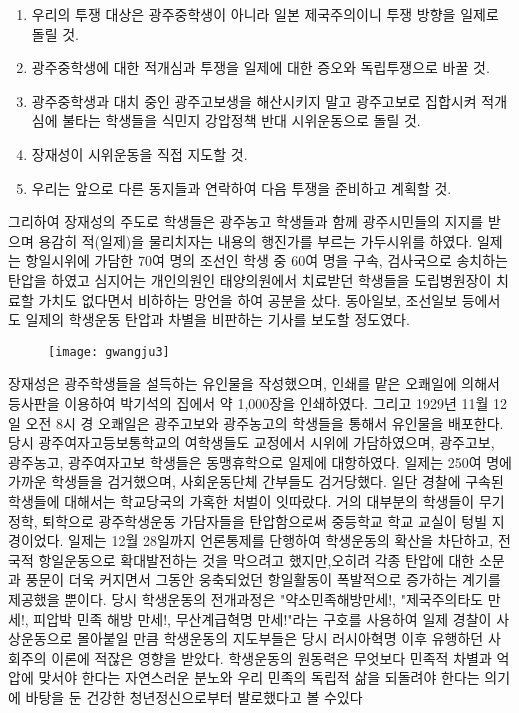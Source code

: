 \begin{enumerate}
\item 우리의 투쟁 대상은 광주중학생이 아니라 일본 제국주의이니 투쟁 방향을 일제로 돌릴 것.
\item 광주중학생에 대한 적개심과 투쟁을 일제에 대한 증오와 독립투쟁으로 바꿀 것.
\item 광주중학생과 대치 중인 광주고보생을 해산시키지 말고 광주고보로 집합시켜 적개심에 불타는 학생들을 식민지 강압정책 반대 시위운동으로 돌릴 것.
\item 장재성이 시위운동을 직접 지도할 것.
\item 우리는 앞으로 다른 동지들과 연락하여 다음 투쟁을 준비하고 계획할 것.
\end{enumerate}

그리하여 장재성의 주도로 학생들은 광주농고 학생들과 함께 광주시민들의 지지를 받으며 용감히 적(일제)을 물리치자는 내용의 행진가를 부르는 가두시위를 하였다. 일제는 항일시위에 가담한 70여 명의 조선인 학생 중 60여 명을 구속, 검사국으로 송치하는 탄압을 하였고 심지어는 개인의원인 태양의원에서 치료받던 학생들을 도립병원장이 치료할 가치도 없다면서 비하하는 망언을 하여 공분을 샀다. 동아일보, 조선일보 등에서도 일제의 학생운동 탄압과 차별을 비판하는 기사를 보도할 정도였다.

\begin{figure}
\texttt{[image: gwangju3]}
\end{figure}

장재성은 광주학생들을 설득하는 유인물을 작성했으며, 인쇄를 맡은 오쾌일에 의해서 등사판을 이용하여 박기석의 집에서 약 1,000장을 인쇄하였다. 그리고 1929년 11월 12일 오전 8시 경 오쾌일은 광주고보와 광주농고의 학생들을 통해서 유인물을 배포한다. 당시 광주여자고등보통학교의 여학생들도 교정에서 시위에 가담하였으며, 광주고보, 광주농고, 광주여자고보 학생들은 동맹휴학으로 일제에 대항하였다. 일제는 250여 명에 가까운 학생들을 검거했으며, 사회운동단체 간부들도 검거당했다. 일단 경찰에 구속된 학생들에 대해서는 학교당국의 가혹한 처벌이 잇따랐다. 거의 대부분의 학생들이 무기정학, 퇴학으로 광주학생운동 가담자들을 탄압함으로써 중등학교 학교 교실이 텅빌 지경이었다. 일제는 12월 28일까지 언론통제를 단행하여 학생운동의 확산을 차단하고, 전국적 항일운동으로 확대발전하는 것을 막으려고 했지만,오히려 각종 탄압에 대한 소문과 풍문이 더욱 커지면서 그동안 웅축되었던 항일활동이 폭발적으로 증가하는 계기를 제공했을 뿐이다. 당시 학생운동의 전개과정은 "약소민족해방만세!, "제국주의타도 만세!, 피압박 민족 해방 만세!, 무산계급혁명 만세!"라는 구호를 사용하여 일제 경찰이 사상운동으로 몰아붙일 만큼 학생운동의 지도부들은 당시 러시아혁명 이후 유행하던 사회주의 이론에 적잖은 영향을 받았다. 학생운동의 원동력은 무엇보다 민족적 차별과 억압에 맞서야 한다는 자연스러운 분노와 우리 민족의 독립적 삶을 되돌려야 한다는 의기에 바탕을 둔 건강한 청년정신으로부터 발로했다고 볼 수있다

